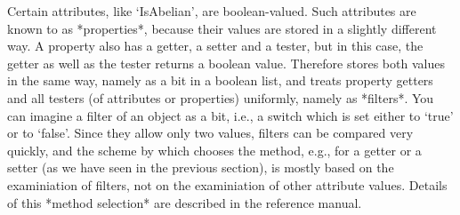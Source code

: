 %
Certain attributes, like `IsAbelian', are boolean-valued. Such attributes
are known to {\GAP} as *properties*, because their values are stored in a
slightly different way. A  property  also has a   getter, a setter  and a
tester, but  in this case,  the getter as  well  as the  tester returns a
boolean   value. Therefore {\GAP} stores  both  values  in  the same way,
namely as  a bit in  a boolean list, and  treats property getters and all
testers (of attributes or properties) uniformly, namely as *filters*. You
can imagine a filter of an  object as a bit,  i.e., a switch which is set
either to `true' or to `false'. Since they allow only two values, filters
can be compared very quickly, and the  scheme by which {\GAP} chooses the
method, e.g., for a getter or  a setter (as we  have seen in the previous
section),  is mostly based  on the  examiniation  of filters, not  on the
examiniation   of   other  attribute values.    Details  of this  *method
selection* are described in the reference manual.

